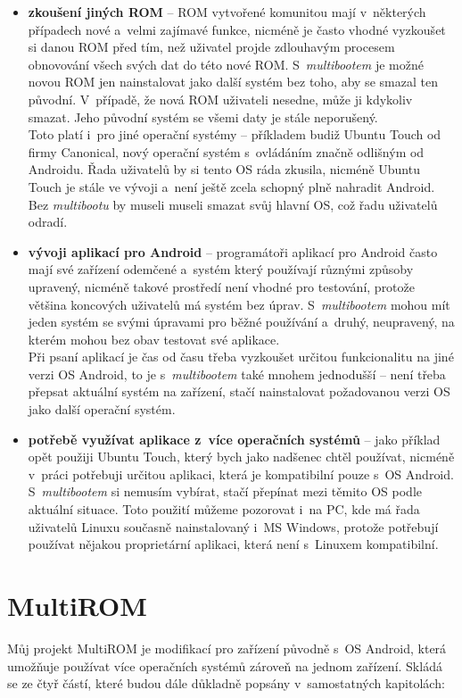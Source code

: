 \documentclass[12pt, a4paper, oneside]{article}
\newcommand{\B}{\textbf} %
\newcommand{\It}{\textit}  %
\begin{document}
\begin{itemize}
    \item \B{zkoušení jiných ROM} -- ROM vytvořené komunitou mají v~některých případech nové a~velmi zajímavé funkce, nicméně je často vhodné vyzkoušet si danou ROM před tím, než uživatel projde zdlouhavým procesem obnovování všech svých dat do této nové ROM. S~\It{multibootem} je možné novou ROM jen nainstalovat jako další systém bez toho, aby se smazal ten původní. V~případě, že nová ROM uživateli nesedne, může ji kdykoliv smazat. Jeho původní systém se všemi daty je stále neporušený.\\
    Toto platí i~pro jiné operační systémy -- příkladem budiž Ubuntu Touch od firmy Canonical, nový operační systém s~ovládáním značně odlišným od Androidu. Řada uživatelů by si tento OS ráda zkusila, nicméně Ubuntu Touch je stále ve vývoji a~není ještě zcela schopný plně nahradit Android. Bez \It{multibootu} by museli museli smazat svůj hlavní OS, což řadu uživatelů odradí.

    \item \B{vývoji aplikací pro Android} -- programátoři aplikací pro Android často mají své zařízení odemčené a~systém který používají různými způsoby upravený, nicméně takové prostředí není vhodné pro testování, protože většina koncových uživatelů má systém bez úprav. S~\It{multibootem} mohou mít jeden systém se svými úpravami pro běžné používání a~druhý, neupravený, na kterém mohou bez obav testovat své aplikace. \\
    Při psaní aplikací je čas od času třeba vyzkoušet určitou funkcionalitu na jiné verzi OS Android, to je s~\It{multibootem} také mnohem jednodušší -- není třeba přepsat aktuální systém na zařízení, stačí nainstalovat požadovanou verzi OS jako další operační systém.

    \item \B{potřebě využívat aplikace z~více operačních systémů} -- jako příklad opět použiji Ubuntu Touch, který bych jako nadšenec chtěl používat, nicméně v~práci potřebuji určitou aplikaci, která je kompatibilní pouze s~OS Android. S~\It{multibootem} si nemusím vybírat, stačí přepínat mezi těmito OS podle aktuální situace. Toto použití můžeme pozorovat i~na PC, kde má řada uživatelů Linuxu současně nainstalovaný i~MS Windows, protože potřebují používat nějakou proprietární aplikaci, která není s~Linuxem kompatibilní.
\end{itemize}

\newpage
\section{MultiROM}
Můj projekt MultiROM je modifikací pro zařízení původně s~OS Android, která umožňuje používat více operačních systémů zároveň na jednom zařízení. Skládá se ze čtyř částí, které budou dále důkladně popsány v~samostatných kapitolách:
\end{document}
